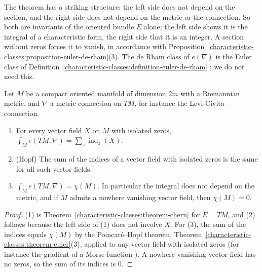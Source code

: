 The theorem has a striking structure: the left side does not depend on the section, and the right side does not depend on the metric or the connection. So both are invariants of
the oriented bundle $E$ alone; the left side shows it is the integral of a characteristic form, the right side that it is an integer. A section without zeros forces it to vanish, in
accordance with Proposition~\ref{characteristic-classes:proposition-euler-de-rham}(3). The de Rham class of $e(\nabla)$ is the Euler class of
Definition~\ref{characteristic-classes:definition-euler-de-rham} \cite[Appendix C]{milnor-stasheff}; we do not need this.

\begin{corollary}\label{characteristic-classes:corollary-gauss-bonnet-chern}
Let $M$ be a compact oriented manifold of dimension $2m$ with a Riemannian metric, and $\nabla$ a metric connection on $TM$, for instance the Levi-Civita connection.
\begin{enumerate}
\item For every vector field $X$ on $M$ with isolated zeros, $\int_Me(TM, \nabla) = \sum_z\operatorname{ind}_z(X)$.
\item (Hopf) The sum of the indices of a vector field with isolated zeros is the same for all such vector fields.
\item $\int_Me(TM, \nabla) = \chi(M)$. In particular the integral does not depend on the metric, and if $M$ admits a nowhere vanishing vector field, then $\chi(M) = 0$.
\end{enumerate}
\end{corollary}

\begin{proof}
(1) is Theorem~\ref{characteristic-classes:theorem-chern} for $E = TM$, and (2) follows because the left side of (1) does not involve $X$. For (3), the sum of the indices equals $\chi(M)$ by the
Poincar\'e--Hopf theorem, Theorem~\ref{characteristic-classes:theorem-euler}(3), applied to any vector field with isolated zeros (for instance the gradient of a Morse function
\cite{milnor-morse}). A nowhere vanishing vector field has no zeros, so the sum of its indices is $0$.
\end{proof}

